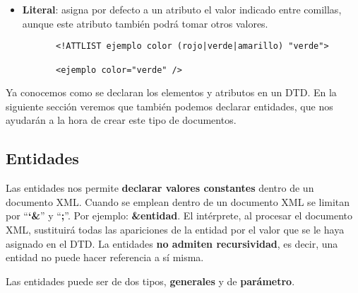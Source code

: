 \begin{itemize}
    \item \textbf{Literal}: asigna por defecto a un atributo el valor indicado entre comillas, aunque este atributo también podrá tomar otros valores.

    \begin{figure}[H]
        \begin{tcolorbox}[sharp corners, colback=yellow!30, colframe=white!20]
            \scriptsize
            \begin{verbatim}
 <!ATTLIST ejemplo color (rojo|verde|amarillo) "verde">

 <ejemplo color="verde" />
            \end{verbatim}
        \end{tcolorbox}
    \end{figure}
\end{itemize}

Ya conocemos como se declaran los elementos y atributos en un DTD. En la siguiente sección veremos que también podemos declarar entidades, que nos ayudarán a la hora de crear este tipo de documentos.

\subsection{Entidades}
Las entidades nos permite \textbf{declarar valores constantes} dentro de un documento XML. Cuando se emplean dentro de un documento XML se limitan por ``\textbf{`\&}'' y ``\textbf{;}''. Por ejemplo: \textbf{\&entidad}. El intérprete, al procesar el documento XML, sustituirá todas las apariciones de la entidad por el valor que se le haya asignado en el DTD. La entidades \textbf{no admiten recursividad}, es decir, una entidad no puede hacer referencia a sí misma.

Las entidades puede ser de dos tipos, \textbf{generales} y de \textbf{parámetro}.

